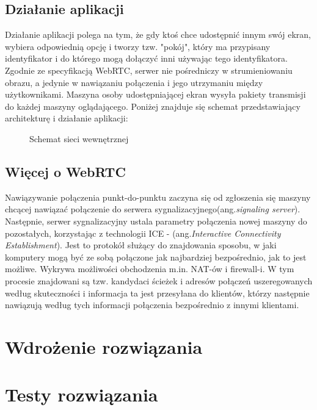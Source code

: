 \documentclass[a4paper,11pt]{article}
\begin{document}
        \subsection{Działanie aplikacji}
        Działanie aplikacji polega na tym, że gdy ktoś chce udostępnić innym swój ekran, wybiera odpowiednią opcję i tworzy tzw. "pokój", 
        który ma przypisany identyfikator i do którego mogą dołączyć inni używając tego identyfikatora. 
        Zgodnie ze specyfikacją WebRTC, serwer nie pośredniczy w strumieniowaniu obrazu, a jedynie w nawiązaniu połączenia i jego utrzymaniu między użytkownikami.   
        Maszyna osoby udostępniającej ekran wysyła pakiety transmisji do każdej maszyny oglądającego. 
        Poniżej znajduje się schemat przedstawiający architekturę i działanie aplikacji: 
        \begin{figure}[!ht]
        \centering
        \def\svgwidth{\columnwidth}
        
        \caption{Schemat sieci wewnętrznej}
        \label{rys1:label}
        \end{figure}
        \subsection{Więcej o WebRTC}
        Nawiązywanie połączenia punkt-do-punktu zaczyna się od zgłoszenia się maszyny chcącej nawiązać połączenie do serwera sygnalizacyjnego(ang.\emph{signaling server}).
        Następnie, serwer sygnalizacyjny ustala parametry połączenia nowej maszyny do pozostałych, korzystając z technologii ICE - (ang.\emph{Interactive Connectivity Establishment}).
        Jest to protokół służący do znajdowania sposobu, w jaki komputery mogą być ze sobą połączone jak najbardziej bezpośrednio, jak to jest możliwe. 
        Wykrywa możliwości obchodzenia m.in. NAT-ów i firewall-i. 
        W tym procesie znajdowani są tzw. kandydaci ścieżek i adresów połączeń uszeregowanych według skuteczności i informacja ta jest przesyłana do klientów, 
        którzy następnie nawiązują według tych informacji połączenia bezpośrednio z innymi klientami.  
    \section{Wdrożenie rozwiązania} 
    \section{Testy rozwiązania}
\end{document}

